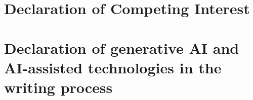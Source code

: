 \begin{linenumbers}
\section{Declaration of Competing Interest}
\label{sec:DeclarationInterest}


\section{Declaration of generative AI and AI-assisted technologies in the writing process}
\label{sec:Declaration AI}


\end{linenumbers}
